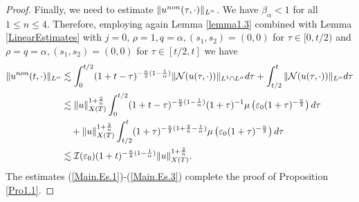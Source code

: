 \documentclass[10pt,a4paper]{amsart}
\begin{document}
\begin{proof}
   Finally, we need to estimate $\|u^{\rm non}(\tau,\cdot)\|_{L^{\alpha}}$. We have $\beta_\alpha < 1$ for all $1 \leq n \leq 4$. Therefore, employing again Lemma \ref{lemma1.3} combined with Lemma \ref{LinearEstimates} with $j = 0, \,\rho = 1, q =\alpha, (s_1, s_2) = (0,0)$ for $\tau \in [0, t/2)$ and $\rho = q =\alpha, (s_1, s_2) = (0,0)$ for $\tau \in [t/2, t]$ we have
   \begin{align}
       \|u^{\rm non}(t,\cdot)\|_{L^\alpha} &\lesssim \int_0^{t/2} (1+t-\tau)^{-\frac{n}{2}(1-\frac{1}{\alpha})} \|\mathcal{N}(u(\tau,\cdot))\|_{L^1 \cap L^\alpha} d\tau  +\int_{t/2}^t \|\mathcal{N}(u(\tau,\cdot))\|_{L^{\alpha}} d\tau \notag\\
       &\lesssim \|u\|_{X(T)}^{1+\frac{2}{n}} \int_0^{t/2} (1+t-\tau)^{-\frac{n}{2}(1-\frac{1}{\alpha})} (1+\tau)^{-1} \mu\left(\varepsilon_0 (1+\tau)^{-\frac{n}{2}}\right) d\tau \notag\\
       &\quad+ \|u\|_{X(T)}^{1+\frac{2}{n}}\int_{t/2}^t (1+\tau)^{-\frac{n}{2}(1+\frac{2}{n}-\frac{1}{\alpha})} \mu\left(\varepsilon_0 (1+\tau)^{-\frac{n}{2}}\right) d\tau \notag\\
       &\lesssim \mathcal{I}(\varepsilon_0) (1+t)^{-\frac{n}{2}(1-\frac{1}{\alpha})} \|u\|_{X(T)}^{1+\frac{2}{n}}. \label{Main.Es.3}
   \end{align}
   The estimates (\ref{Main.Es.1})-(\ref{Main.Es.3}) complete the proof of Proposition \ref{Pro1.1}.
     \end{proof}
\end{document}
